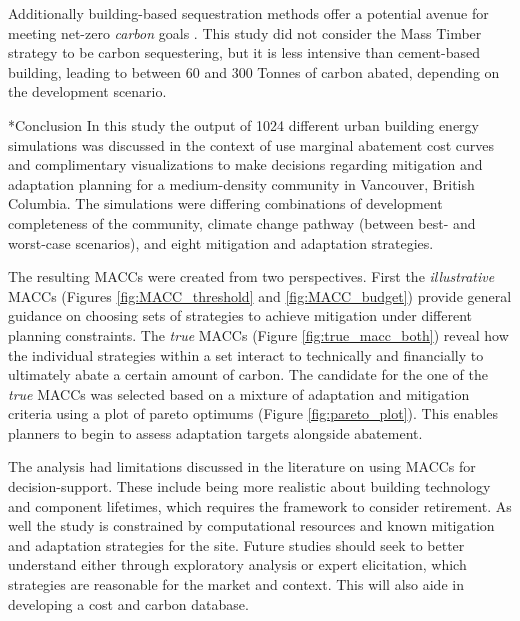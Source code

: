 \documentclass[twocolumn, a4paper,10pt]{article}
\makeatletter
\renewcommand\section{\@startsection{section}{1}{\z@}{3pt}{3pt}{\normalfont\large\bfseries}}
\makeatother
\begin{document}
Additionally building-based sequestration methods offer a potential avenue for meeting net-zero \textit{carbon} goals \citep{skullestad_high-rise_2016}. This study did not consider the Mass Timber strategy to be carbon sequestering, but it is less intensive than cement-based building, leading to between 60 and 300 Tonnes of carbon abated, depending on the development scenario.


\section*{Conclusion}
In this study the output of 1024 different urban building energy simulations was discussed in the context of use marginal abatement cost curves and complimentary visualizations to make decisions regarding mitigation and adaptation planning for a medium-density community in Vancouver, British Columbia. The simulations were differing combinations of development completeness of the community, climate change pathway (between best- and worst-case scenarios), and eight mitigation and adaptation strategies. 

The resulting MACCs were created from two perspectives. First the \textit{illustrative} MACCs (Figures \ref{fig:MACC_threshold} and \ref{fig:MACC_budget}) provide general guidance on choosing sets of strategies to achieve mitigation under different planning constraints. The \textit{true} MACCs (Figure \ref{fig:true_macc_both}) reveal how the individual strategies within a set interact to technically and financially to ultimately abate a certain amount of carbon. The candidate for the one of the \textit{true} MACCs was selected based on a mixture of adaptation and mitigation criteria using a plot of pareto optimums (Figure \ref{fig:pareto_plot}). This enables planners to begin to assess adaptation targets alongside abatement.

The analysis had limitations discussed in the literature on using MACCs for decision-support. These include being more realistic about building technology and component lifetimes, which requires the framework to consider retirement. As well the study is constrained by computational resources and known mitigation and adaptation strategies for the site. Future studies should seek to better understand either through exploratory analysis or expert elicitation, which strategies are reasonable for the market and context. This will also aide in developing a cost and carbon database.
\end{document}
